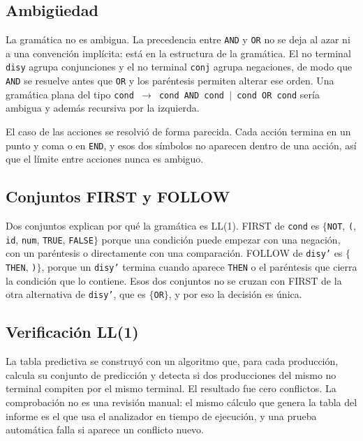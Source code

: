 \documentclass[11pt,letterpaper]{article}
\newcommand{\code}[1]{\texttt{#1}}
\begin{document}
\subsection{Ambigüedad}

La gramática no es ambigua. La precedencia entre \code{AND} y \code{OR} no se deja al azar ni a una convención implícita: está en la estructura de la gramática. El no terminal \code{disy} agrupa conjunciones y el no terminal \code{conj} agrupa negaciones, de modo que \code{AND} se resuelve antes que \code{OR} y los paréntesis permiten alterar ese orden. Una gramática plana del tipo \code{cond $\rightarrow$ cond AND cond $\mid$ cond OR cond} sería ambigua y además recursiva por la izquierda.

El caso de las acciones se resolvió de forma parecida. Cada acción termina en un punto y coma o en \code{END}, y esos dos símbolos no aparecen dentro de una acción, así que el límite entre acciones nunca es ambiguo.

\subsection{Conjuntos FIRST y FOLLOW}



Dos conjuntos explican por qué la gramática es LL(1). FIRST de \code{cond} es $\{$\code{NOT}, \code{(}, \code{id}, \code{num}, \code{TRUE}, \code{FALSE}$\}$ porque una condición puede empezar con una negación, con un paréntesis o directamente con una comparación. FOLLOW de \code{disy'} es $\{$\code{THEN}, \code{)}$\}$, porque un \code{disy'} termina cuando aparece \code{THEN} o el paréntesis que cierra la condición que lo contiene. Esos dos conjuntos no se cruzan con FIRST de la otra alternativa de \code{disy'}, que es $\{$\code{OR}$\}$, y por eso la decisión es única.

\subsection{Verificación LL(1)}

La tabla predictiva se construyó con un algoritmo que, para cada producción, calcula su conjunto de predicción y detecta si dos producciones del mismo no terminal compiten por el mismo terminal. El resultado fue cero conflictos. La comprobación no es una revisión manual: el mismo cálculo que genera la tabla del informe es el que usa el analizador en tiempo de ejecución, y una prueba automática falla si aparece un conflicto nuevo.
\end{document}
